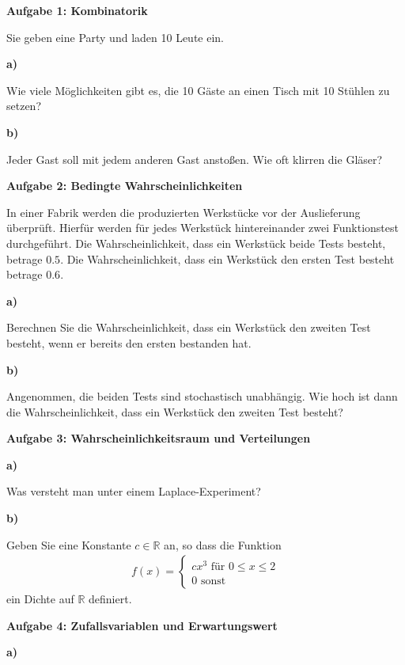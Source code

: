 \documentclass[a4paper,12pt]{article}
\begin{document}
{\bf Aufgabe 1: Kombinatorik}

Sie geben eine Party und laden 10 Leute ein.

{\bf a) }

Wie viele Möglichkeiten gibt es, die 10 Gäste an einen Tisch mit 10 Stühlen zu setzen?

{\bf b)}

 Jeder Gast soll mit jedem anderen Gast anstoßen. Wie oft klirren die Gläser?

\hspace{10mm}



{\bf Aufgabe 2: Bedingte Wahrscheinlichkeiten}

In einer Fabrik werden die produzierten Werkstücke vor der Auslieferung überprüft. Hierfür werden für jedes Werkstück  hintereinander zwei Funktionstest durchgeführt.  Die Wahrscheinlichkeit, dass ein Werkstück beide Tests besteht, betrage $0.5$. Die Wahrscheinlichkeit, dass ein Werkstück  den ersten Test besteht betrage $0.6$. 

{\bf a) }

Berechnen Sie die Wahrscheinlichkeit, dass ein Werkstück den zweiten Test besteht, wenn er bereits den ersten bestanden hat.

{\bf b) }

Angenommen, die beiden Tests sind stochastisch unabhängig. Wie hoch ist dann die Wahrscheinlichkeit, dass ein Werkstück den zweiten Test besteht?

\hspace{10mm}

{\bf Aufgabe 3: Wahrscheinlichkeitsraum und Verteilungen}

{\bf a)  }

Was versteht man unter einem Laplace-Experiment?

{\bf b) }

Geben Sie eine Konstante $c  \in \mathbb{R}$ an, so dass die Funktion 
\begin{align*}
f(x) = \begin{cases} c x^3 \text{ für }  0\leq x \leq 2 \\ 0 \text{ sonst}\end{cases}
\end{align*}
ein Dichte auf $\mathbb{R}$ definiert.

\hspace{10mm}


{\bf Aufgabe 4: Zufallsvariablen und Erwartungswert}

{\bf a)}
\end{document}
